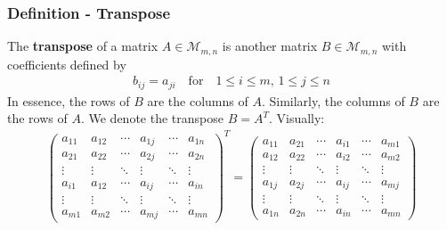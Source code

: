 \documentclass[usenames,dvipsnames,aspectratio=169,10pt]{beamer}
\numberwithin{equation}{section}
\begin{document}
\begin{frame}
\frametitle{Definition - Transpose}
The \textbf{transpose} of a matrix $A \in \mathcal{M}_{m,n}$ is another matrix $B \in \mathcal{M}_{m,n}$ with coefficients defined by
\begin{align*}
b_{ij} = a_{ji} \quad \text{for} \quad 1 \leq i \leq m, \, 1 \leq j \leq n
\end{align*}
In essence, the rows of $B$ are the columns of $A$. Similarly, the columns of $B$ are the rows of $A$. We denote the transpose $B = A^T$. Visually:
\begin{align*}
\begin{pmatrix}
a_{11} & a_{12} & \cdots & a_{1j} & \cdots & a_{1n} \\
a_{21} & a_{22} & \cdots & a_{2j} & \cdots & a_{2n} \\
\vdots & \vdots & \ddots & \vdots & \ddots & \vdots \\
a_{i1} & a_{12} & \cdots & a_{ij} & \cdots & a_{in} \\
\vdots & \vdots & \ddots & \vdots & \ddots & \vdots \\
a_{m1} & a_{m2} & \cdots & a_{mj} & \cdots & a_{mn}
\end{pmatrix}^T
=
\begin{pmatrix}
a_{11} & a_{21} & \cdots & a_{i1} & \cdots & a_{m1} \\
a_{12} & a_{22} & \cdots & a_{i2} & \cdots & a_{m2} \\
\vdots & \vdots & \ddots & \vdots & \ddots & \vdots \\
a_{1j} & a_{2j} & \cdots & a_{ij} & \cdots & a_{mj} \\
\vdots & \vdots & \ddots & \vdots & \ddots & \vdots \\
a_{1n} & a_{2n} & \cdots & a_{in} & \cdots & a_{mn}
\end{pmatrix}
\end{align*}
\end{frame}
\end{document}

